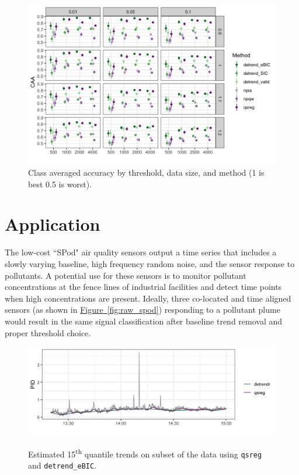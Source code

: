 \documentclass[12pt]{article}
\newcommand{\Fig}[1]{\hyperref[fig:#1]{Figure~\ref*{fig:#1}}} %
\newcommand{\Fig}[1]{{Figure~\ref{fig:#1}}} %
\begin{document}
	\begin{figure}[h!]
		\includegraphics[width = \linewidth]{Figures/peaks_CAA.png}
		\caption{Class averaged accuracy by threshold, data size, and method (1 is best 0.5 is worst).}		
	\end{figure}


	\FloatBarrier
	
	\section{Application}
	
	The low-cost ``SPod" air quality sensors output a time series that includes a slowly varying baseline, high frequency random noise, and the sensor response to pollutants. A potential use for these sensors is to monitor pollutant concentrations at the fence lines of industrial facilities and detect time points when high concentrations are present. Ideally, three co-located and time aligned sensors (as shown in \Fig{raw_spod}) responding to a pollutant plume would result in the same signal classification after baseline trend removal and proper threshold choice. 
	
	\begin{figure}
		\caption{Estimated 15\textsuperscript{th} quantile trends on subset of the data using \texttt{qsreg} and \texttt{detrend\_eBIC}.} 
		\includegraphics[width = \linewidth]{Figures/short_trends.png}
		\label{fig:short-trends}
	\end{figure}
\end{document}
